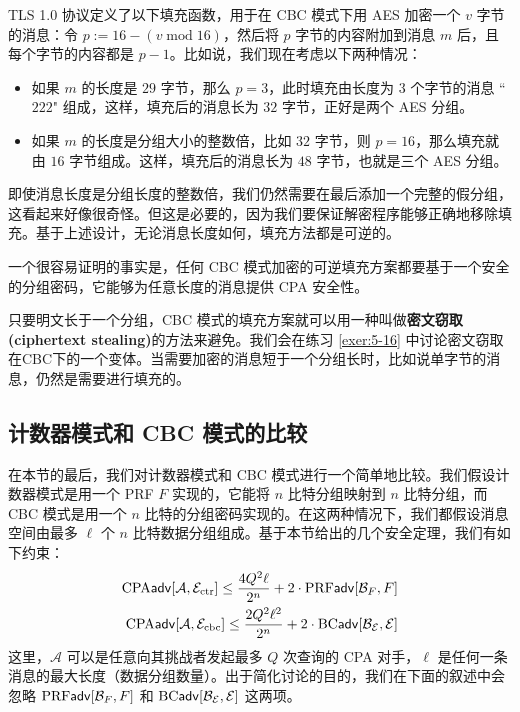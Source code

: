 TLS 1.0 协议定义了以下填充函数，用于在 CBC 模式下用 AES 加密一个 $v$ 字节的消息：令 $p:=16-(v\;\mathrm{mod}\;16)$，然后将 $p$ 字节的内容附加到消息 $m$ 后，且每个字节的内容都是 $p-1$。比如说，我们现在考虑以下两种情况：
\begin{itemize}
	\item 如果 $m$ 的长度是 $29$ 字节，那么 $p = 3$，此时填充由长度为 $3$ 个字节的消息 ``$222$" 组成，这样，填充后的消息长为 $32$ 字节，正好是两个 AES 分组。
	\item 如果 $m$ 的长度是分组大小的整数倍，比如 $32$ 字节，则 $p = 16$，那么填充就由 $16$ 字节组成。这样，填充后的消息长为 $48$ 字节，也就是三个 AES 分组。
\end{itemize}
即使消息长度是分组长度的整数倍，我们仍然需要在最后添加一个完整的假分组，这看起来好像很奇怪。但这是必要的，因为我们要保证解密程序能够正确地移除填充。基于上述设计，无论消息长度如何，填充方法都是可逆的。

一个很容易证明的事实是，任何 CBC 模式加密的可逆填充方案都要基于一个安全的分组密码，它能够为任意长度的消息提供 CPA 安全性。

只要明文长于一个分组，CBC 模式的填充方案就可以用一种叫做\textbf{密文窃取 (ciphertext stealing)}的方法来避免。我们会在练习 \ref{exer:5-16} 中讨论密文窃取在CBC下的一个变体。当需要加密的消息短于一个分组长时，比如说单字节的消息，仍然是需要进行填充的。

\subsection{计数器模式和 CBC 模式的比较}\label{subsec:5-4-5}

在本节的最后，我们对计数器模式和 CBC 模式进行一个简单地比较。我们假设计数器模式是用一个 PRF $F$ 实现的，它能将 $n$ 比特分组映射到 $n$ 比特分组，而 CBC 模式是用一个 $n$ 比特的分组密码实现的。在这两种情况下，我们都假设消息空间由最多 $\ell$ 个 $n$ 比特数据分组组成。基于本节给出的几个安全定理，我们有如下约束：
\[
\begin{aligned}
{\rm CPA}\mathsf{adv}[\mathcal{A}, \mathcal{E}_{\rm ctr}]\leq\frac{4Q^2\ell}{2^n}+2\cdot{\rm PRF}\mathsf{adv}[\mathcal{B}_F,F]\\
{\rm CPA}\mathsf{adv}[\mathcal{A},\mathcal{E}_{\rm cbc}]\leq\frac{2Q^2\ell^2}{2^n}+2\cdot{\rm BC}\mathsf{adv}[\mathcal{B}_\mathcal{E},\mathcal{E}]
\end{aligned}
\]
这里，$\mathcal{A}$ 可以是任意向其挑战者发起最多 $Q$ 次查询的 CPA 对手，$\ell$ 是任何一条消息的最大长度（数据分组数量）。出于简化讨论的目的，我们在下面的叙述中会忽略 ${\rm PRF}\mathsf{adv}[\mathcal{B}_F,F]$ 和 ${\rm BC}\mathsf{adv}[\mathcal{B}_\mathcal{E},\mathcal{E}]$ 这两项。

